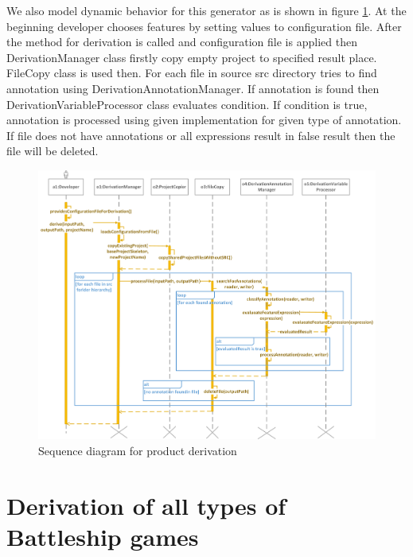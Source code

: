 \documentclass[11pt,slovak,a4paper,twoside]{article}
\begin{document}
We also model dynamic behavior for this generator as is shown in figure \ref{derivationProductSequenceDiagram}. At the beginning developer chooses features by setting values to configuration file. After the method for derivation is called and configuration file is applied then DerivationManager class firstly copy empty project to specified result place. FileCopy class is used then. For each file in source src directory tries to find annotation using DerivationAnnotationManager. If annotation is found then DerivationVariableProcessor class evaluates condition. If condition is true, annotation is processed using given implementation for given type of annotation. If file does not have annotations or all expressions result in false result then the file will be deleted.

\begin{figure}[!t]  %
					\begin{center}
									\includegraphics[width=\linewidth]{fig/derivationProcessTight.png}
									\caption{Sequence diagram for product derivation}
									\label{derivationProductSequenceDiagram}
					\end{center}
\end{figure}


\section{Derivation of all types of Battleship games} \label{allDerivations}
\end{document}
